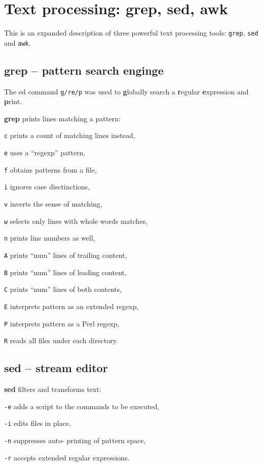 \section{Text processing: grep, sed, awk}
This is an expanded description of three powerful text processing tools:
\texttt{grep}, \texttt{sed} and \texttt{awk}.

\subsection{grep -- pattern search enginge}
The ed command \texttt{g/re/p} was used to \textbf{g}lobally search a \textbf{r}egular \textbf{e}xpression and \textbf{p}rint.
\begin{compactenum}
\item [\cmdvar] \textbf{grep} prints lines matching a pattern:
\item [\texttt{c}] prints a count of matching lines instead,
\item [\texttt{e}] uses a ``regexp'' pattern,
\item [\texttt{f}] obtains patterns from a file,
\item [\texttt{i}] ignores case disctinctions,
\item [\texttt{v}] inverts the sense of matching,
\item [\texttt{w}] selects only lines with whole words matches,
\item [\texttt{n}] prints line numbers as well,
\item [\texttt{A}] prints ``num'' lines of trailing content,
\item [\texttt{B}] prints ``num'' lines of leading content,
\item [\texttt{C}] prints ``num'' lines of both contents,
\item [\texttt{E}] interprets pattern as an extended regexp,
\item [\texttt{P}] interprets pattern as a Perl regexp,
\item [\texttt{R}] reads all files under each directory.
\end{compactenum}

\subsection{sed -- stream editor}
\begin{compactenum}
	\item [\cmdcore] \textbf{sed} filters and transforms text:
	\item [\texttt{-e}] adds a script to the commands to be executed,
	\item [\texttt{-i}] edits files in place,
	\item [\texttt{-n}] suppresses auto- printing of pattern space,
  \item [\texttt{-r}] accepts extended regular expressions.
\end{compactenum}

